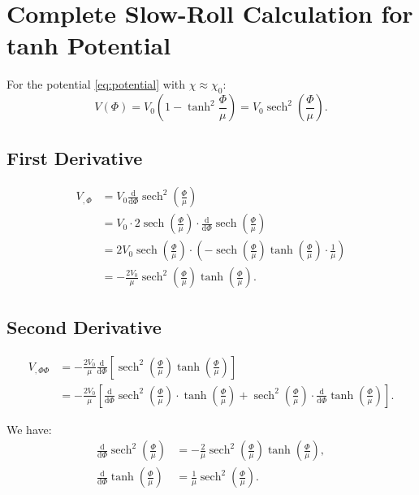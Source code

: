 \documentclass[11pt,a4paper]{article}
\numberwithin{equation}{section}
\theoremstyle{plain}
\theoremstyle{definition}
\theoremstyle{remark}
\newcommand{\dd}{\mathrm{d}}
\begin{document}
\section{Complete Slow-Roll Calculation for tanh Potential}
\label{app:slowroll}

For the potential \eqref{eq:potential} with $\chi \approx \chi_0$:
\begin{equation}
V(\Phi) = V_0\left(1 - \tanh^2\frac{\Phi}{\mu}\right) = V_0\operatorname{sech}^2\left(\frac{\Phi}{\mu}\right).
\end{equation}

\subsection{First Derivative}

\begin{align}
V_{,\Phi} &= V_0\frac{\dd}{\dd\Phi}\operatorname{sech}^2\left(\frac{\Phi}{\mu}\right)\\
&= V_0 \cdot 2\operatorname{sech}\left(\frac{\Phi}{\mu}\right)\cdot\frac{\dd}{\dd\Phi}\operatorname{sech}\left(\frac{\Phi}{\mu}\right)\\
&= 2V_0\operatorname{sech}\left(\frac{\Phi}{\mu}\right)\cdot\left(-\operatorname{sech}\left(\frac{\Phi}{\mu}\right)\tanh\left(\frac{\Phi}{\mu}\right)\cdot\frac{1}{\mu}\right)\\
&= -\frac{2V_0}{\mu}\operatorname{sech}^2\left(\frac{\Phi}{\mu}\right)\tanh\left(\frac{\Phi}{\mu}\right).
\end{align}

\subsection{Second Derivative}

\begin{align}
V_{,\Phi\Phi} &= -\frac{2V_0}{\mu}\frac{\dd}{\dd\Phi}\left[\operatorname{sech}^2\left(\frac{\Phi}{\mu}\right)\tanh\left(\frac{\Phi}{\mu}\right)\right]\\
&= -\frac{2V_0}{\mu}\left[\frac{\dd}{\dd\Phi}\operatorname{sech}^2\left(\frac{\Phi}{\mu}\right)\cdot\tanh\left(\frac{\Phi}{\mu}\right) + \operatorname{sech}^2\left(\frac{\Phi}{\mu}\right)\cdot\frac{\dd}{\dd\Phi}\tanh\left(\frac{\Phi}{\mu}\right)\right].
\end{align}

We have:
\begin{align}
\frac{\dd}{\dd\Phi}\operatorname{sech}^2\left(\frac{\Phi}{\mu}\right) &= -\frac{2}{\mu}\operatorname{sech}^2\left(\frac{\Phi}{\mu}\right)\tanh\left(\frac{\Phi}{\mu}\right),\\
\frac{\dd}{\dd\Phi}\tanh\left(\frac{\Phi}{\mu}\right) &= \frac{1}{\mu}\operatorname{sech}^2\left(\frac{\Phi}{\mu}\right).
\end{align}
\end{document}
